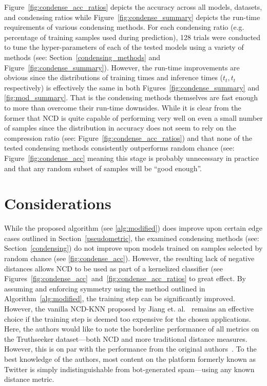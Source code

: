 \documentclass[conference]{IEEEtran}
\begin{document}
Figure~\ref{fig:condense_acc_ratios} depicts the accuracy across all models, datasets, and condensing ratios while Figure~\ref{fig:condense_summary} depicts the run-time requirements of various condensing methods. 
For each condensing ratio (e.g. percentage of training samples used during prediction), 128 trials were conducted to tune the hyper-parameters of each of the tested models using a variety of methods (see: Section~\ref{condensing_methods} and Figure~\ref{fig:condense_summary}). 
However, the run-time improvements are obvious since the distributions of training times and inference times ($t_t, t_t$ respectively) is effectively the same in both Figures~\ref{fig:condense_summary} and \ref{fig:mod_summary}. That is the condensing methods themselves are fast enough to more than overcome their run-time downsides. 
While it is clear from the former that NCD is quite capable of performing very well on even a small number of samples since the distribution in accuracy does not seem to rely on the compression ratio (see: Figure~\ref{fig:condense_acc_ratios}) and that none of the tested condensing methods consistently outperforms random chance (see: Figure~\ref{fig:condense_acc} meaning this stage is probably unnecessary in practice and that any random subset of samples will be ``good enough''. 

\section{Considerations}
\label{considerations}
While the proposed algorithm (see \ref{alg:modified}) does improve upon certain edge cases outlined in Section~\ref{pseudometric}, the examined condensing methods (see: Section~\ref{condensing}) do not improve upon models trained on samples selected by random chance (see \ref{fig:condense_acc}). However, the resulting lack of negative distances allows NCD to be used as part of a kernelized classifier (see Figures~\ref{fig:condense_acc}~and~\ref{fig:condense_acc_ratios} to great effect. 
By assuming and enforcing symmetry using the method outlined in Algorithm~\ref{alg:modified}, the training step can be significantly improved.
However, the vanilla NCD-KNN proposed by Jiang et. al.~\cite{jiang2022less} remains an effective choice if the training step is deemed too expensive for the chosen applications.
Here, the authors would like to note the borderline performance of all metrics on the Truthseeker dataset---both NCD and more traditional distance measures. However, this is on par with the performance from the original authors~\cite{truthseeker}. To the best knowledge of the authors, most content on the platform formerly known as Twitter is simply indistinguishable from bot-generated spam---using any known distance metric.
\end{document}
